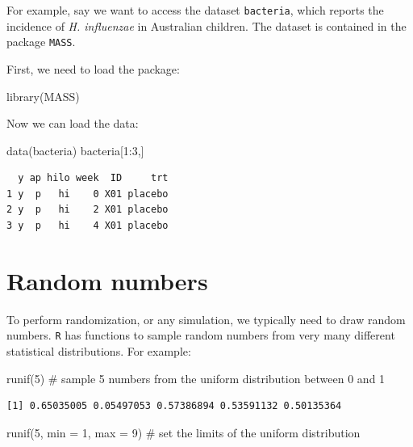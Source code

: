 \documentclass[
  letterpaper,
  DIV=11,
  numbers=noendperiod]{scrreprt}
\newenvironment{Shaded}{\begin{snugshade}}{\end{snugshade}}
\newcommand{\AttributeTok}[1]{\textcolor[rgb]{0.40,0.45,0.13}{#1}}
\newcommand{\CommentTok}[1]{\textcolor[rgb]{0.37,0.37,0.37}{#1}}
\newcommand{\DecValTok}[1]{\textcolor[rgb]{0.68,0.00,0.00}{#1}}
\newcommand{\FunctionTok}[1]{\textcolor[rgb]{0.28,0.35,0.67}{#1}}
\newcommand{\NormalTok}[1]{\textcolor[rgb]{0.00,0.23,0.31}{#1}}
\newcommand{\SpecialCharTok}[1]{\textcolor[rgb]{0.37,0.37,0.37}{#1}}
\begin{document}
For example, say we want to access the dataset \texttt{bacteria}, which
reports the incidence of \emph{H. influenzae} in Australian children.
The dataset is contained in the package \texttt{MASS}.

First, we need to load the package:

\begin{Shaded}
\begin{Highlighting}[]
\FunctionTok{library}\NormalTok{(MASS)}
\end{Highlighting}
\end{Shaded}

Now we can load the data:

\begin{Shaded}
\begin{Highlighting}[]
\FunctionTok{data}\NormalTok{(bacteria)}
\NormalTok{bacteria[}\DecValTok{1}\SpecialCharTok{:}\DecValTok{3}\NormalTok{,]}
\end{Highlighting}
\end{Shaded}

\begin{verbatim}
  y ap hilo week  ID     trt
1 y  p   hi    0 X01 placebo
2 y  p   hi    2 X01 placebo
3 y  p   hi    4 X01 placebo
\end{verbatim}

\hypertarget{random-numbers}{%
\section{Random numbers}\label{random-numbers}}

To perform randomization, or any simulation, we typically need to draw
random numbers. \texttt{R} has functions to sample random numbers from
very many different statistical distributions. For example:

\begin{Shaded}
\begin{Highlighting}[]
\FunctionTok{runif}\NormalTok{(}\DecValTok{5}\NormalTok{) }\CommentTok{\# sample 5 numbers from the uniform distribution between 0 and 1}
\end{Highlighting}
\end{Shaded}

\begin{verbatim}
[1] 0.65035005 0.05497053 0.57386894 0.53591132 0.50135364
\end{verbatim}

\begin{Shaded}
\begin{Highlighting}[]
\FunctionTok{runif}\NormalTok{(}\DecValTok{5}\NormalTok{, }\AttributeTok{min =} \DecValTok{1}\NormalTok{, }\AttributeTok{max =} \DecValTok{9}\NormalTok{) }\CommentTok{\# set the limits of the uniform distribution}
\end{Highlighting}
\end{Shaded}
\end{document}

